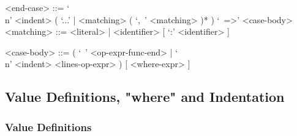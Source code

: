 \documentclass{article}
\begin{document}
\begin{itemize}
\begin{grammar}
<end-case> ::=
`\\n' <indent> ( `...' | <matching> ( `,\ ' <matching> )* ) `\ =>' <case-body>\\

<matching> ::= <literal> | <identifier> [ `:' <identifier> ]

<case-body> ::=
( `\ ' <op-expr-func-end> | `\\n' <indent> <lines-op-expr> ) [ <where-expr> ]
\end{grammar}

\end{itemize}

\subsection{Value Definitions, "where" and Indentation}
\label{subsec:valdefswhere}

\subsubsection{Value Definitions}
\label{subsubsec:valdefs}
\end{document}
